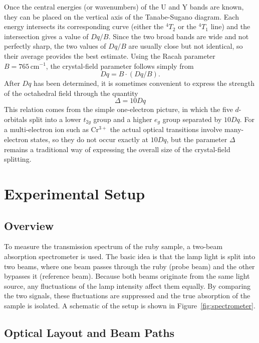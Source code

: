 \documentclass[a4paper]{article}
\begin{document}
Once the central energies (or wavenumbers) of the U and Y bands are known, they can be placed on the vertical axis of the Tanabe-Sugano diagram.
Each energy intersects its corresponding curve (either the ${}^{4}T_{2}$ or the ${}^{4}T_{1}$ line) and the intersection gives a value of $Dq/B$.
Since the two broad bands are wide and not perfectly sharp, the two values of $Dq/B$ are usually close but not identical, so their average provides the best estimate.
Using the Racah parameter $B = 765\,\mathrm{cm^{-1}}$, the crystal-field parameter follows simply from
\[
Dq = B\cdot(Dq/B).
\]
After $Dq$ has been determined, it is sometimes convenient to express the strength of the octahedral field through the quantity
\begin{equation}
    \Delta = 10Dq
    \label{eq:delta_definition}
\end{equation}
This relation comes from the simple one-electron picture, in which the five $d$-orbitals split into a lower $t_{2g}$ group and a higher $e_{g}$ group separated by $10Dq$.
For a multi-electron ion such as Cr$^{3+}$ the actual optical transitions involve many-electron states, so they do not occur exactly at $10Dq$, but the parameter $\Delta$ remains a traditional way of expressing the overall size of the crystal-field splitting.



\section{Experimental Setup}
\subsection{Overview}

To measure the transmission spectrum of the ruby sample, a two-beam absorption spectrometer is used.
The basic idea is that the lamp light is split into two beams, where one beam passes through the ruby (probe beam) and the other bypasses it (reference beam).
Because both beams originate from the same light source, any fluctuations of the lamp intensity affect them equally.
By comparing the two signals, these fluctuations are  suppressed and the true absorption of the sample is isolated.
A schematic of the setup is shown in Figure~\ref{fig:spectrometer}.


\subsection{Optical Layout and Beam Paths}
\end{document}

